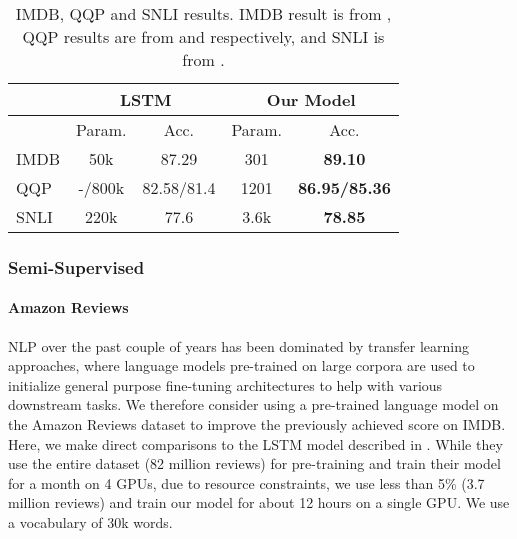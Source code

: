 \documentclass{article}
\begin{document}
\begin{table}
\caption{IMDB, QQP and SNLI results. IMDB result is from \cite{gu2020hippo}, QQP results are from \cite{shen2018baseline} and \cite{sharma2019natural} respectively, and SNLI is from \cite{bowman2015large}.}
\label{table: imdb, qqp, snli}
\begin{center}
\begin{tabular}{lcccc}
\hline\noalign{\smallskip}
& \multicolumn{2}{c}{LSTM} &  \multicolumn{2}{c}{Our Model}\\
\hline\noalign{\smallskip}
& Param. & Acc. & Param. & Acc. \\
\hline\noalign{\smallskip}
IMDB &  50k & 87.29  &  301 & {\bf 89.10} \\
QQP & -/800k & 82.58/81.4  & 1201 &  {\bf 86.95/85.36}\\
SNLI & 220k & 77.6 & 3.6k & {\bf 78.85}  \\
\hline
\end{tabular}
\end{center}
\end{table}

\subsubsection*{Semi-Supervised}

\paragraph{Amazon Reviews} NLP over the past couple of years has been dominated by transfer learning approaches, where language models pre-trained on large corpora are used to initialize general purpose fine-tuning architectures to help with various downstream tasks. We therefore consider using a pre-trained language model on the Amazon Reviews dataset to improve the previously achieved score on IMDB. Here, we make direct comparisons to the LSTM model described in \citet{radford2017learning}. While they use the entire dataset (82 million reviews) for pre-training and train their model for a month on 4 GPUs, due to resource constraints, we use less than 5\% (3.7 million reviews) and train our model for about 12 hours on a single GPU. We use a vocabulary of 30k words.
\end{document}
